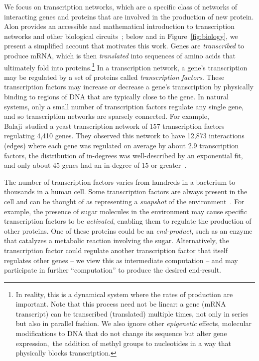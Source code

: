 We focus on transcription networks, which are a specific class of networks of
interacting genes and proteins that are involved in the production of new
protein. Alon provides an accessible and mathematical introduction to
transcription networks and other biological circuits~\cite{Alon:2006}; below and
in Figure~\ref{fig:biology}, we present a simplified account that motivates this
work. Genes are \emph{transcribed} to produce mRNA, which is then
\emph{translated} into sequences of amino acids that ultimately fold into
proteins.\footnote{In reality, this is a dynamical system where the rates of
production are important. Note that this process need not be linear: a gene (mRNA
transcript) can be transcribed (translated) multiple times, not only in series
but also in parallel fashion.  We also ignore
other \emph{epigenetic} effects, \ie molecular modifications to DNA that do not
change its sequence but alter gene expression,~\eg the addition of methyl groups
to nucleotides in a way that physically blocks transcription.}
In a transcription network, a gene's transcription may be regulated by a set of
proteins called \emph{transcription factors}.
These transcription factors may increase or decrease a gene's transcription by
physically binding to regions of DNA that are typically close to the gene.
In natural systems, only a small number of transcription factors
regulate any single gene, and so transcription networks are sparsely connected.
For example, Balaji~\etal studied a yeast
transcription network of 157 transcription factors regulating 4,410 genes. They
observed this network to have 12,873 interactions (edges) where each gene was
regulated on average by about 2.9 transcription factors, the distribution of
in-degrees was well-described by an exponential fit, and only about 45 genes had
an in-degree of 15 or greater~\cite{Balaji:2006}.

The number of transcription factors varies from hundreds in a bacterium to
thousands in a human cell. Some transcription factors are always present in the
cell and can be thought of as representing a \emph{snapshot} of the
environment~\cite{Alon:2006}.
For example, the presence of sugar molecules in the environment may cause
specific transcription factors to be \emph{activated}, enabling them to regulate
the production of other proteins.  One of these proteins could be an
\emph{end-product}, such as an enzyme that catalyzes a metabolic reaction
involving the sugar. Alternatively, the transcription factor could regulate
another transcription factor that itself
regulates other genes -- we view this as intermediate computation -- and may
participate in further ``computation'' to produce the desired end-result.

